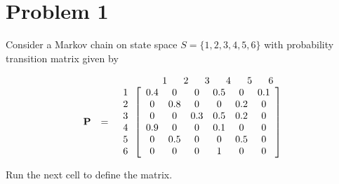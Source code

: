 \documentclass[11pt]{article}
\begin{document}
    \hypertarget{problem-1}{%
\section{Problem 1}\label{problem-1}}

Consider a Markov chain on state space \(S = \{1,2,3,4,5,6\}\) with
probability transition matrix given by

\[
\begin{array}{lcr}  &&1\,\,\,\,\,\,\,\,\,\,2\,\,\,\,\,\,\,\,\,\,3\,\,\,\,\,\,\,\,\,\,4\,\,\,\,\,\,\,\,\,\,5\,\,\,\,\,\,\,\,\,\,6\,\,\,\,\,\\
\bf{P} &=& \begin{array}{c} 1\\2\\3\\4\\5\\6\end{array}\left[ 
\begin{array}{cccccc}
0.4 & 0 & 0 & 0.5 & 0 & 0.1\\
0 & 0.8 & 0 & 0 & 0.2 & 0\\
0 & 0 & 0.3 & 0.5 & 0.2 & 0\\
0.9 & 0 & 0 & 0.1 & 0 & 0\\
0 & 0.5 & 0 & 0 & 0.5 & 0\\
0 & 0 & 0 & 1 & 0 & 0\\
\end{array}
\right]
\end{array}
\]

Run the next cell to define the matrix.
\end{document}
